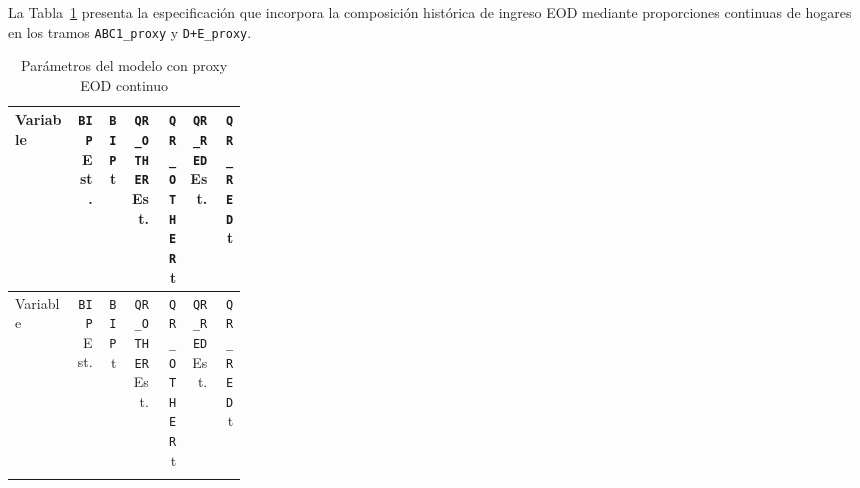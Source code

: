 La Tabla~\ref{tab:parametros_modelo_continuo} presenta la especificación que incorpora la composición
histórica de ingreso EOD mediante proporciones continuas de hogares en los tramos
\texttt{ABC1\_proxy} y \texttt{D+E\_proxy}.

\begin{landscape}
\small
\setlength{\tabcolsep}{3pt}
\begin{longtable}{p{0.27\linewidth}rrrrrr}
\caption{Parámetros del modelo con proxy EOD continuo}
\label{tab:parametros_modelo_continuo}\\
\toprule
Variable &
\texttt{BIP} Est. & \texttt{BIP} t &
\texttt{QR\_OTHER} Est. & \texttt{QR\_OTHER} t &
\texttt{QR\_RED} Est. & \texttt{QR\_RED} t \\
\midrule
\endfirsthead

\toprule
Variable &
\texttt{BIP} Est. & \texttt{BIP} t &
\texttt{QR\_OTHER} Est. & \texttt{QR\_OTHER} t &
\texttt{QR\_RED} Est. & \texttt{QR\_RED} t \\
\midrule
\endhead

\bottomrule
\endfoot


\end{longtable}
\end{landscape}

